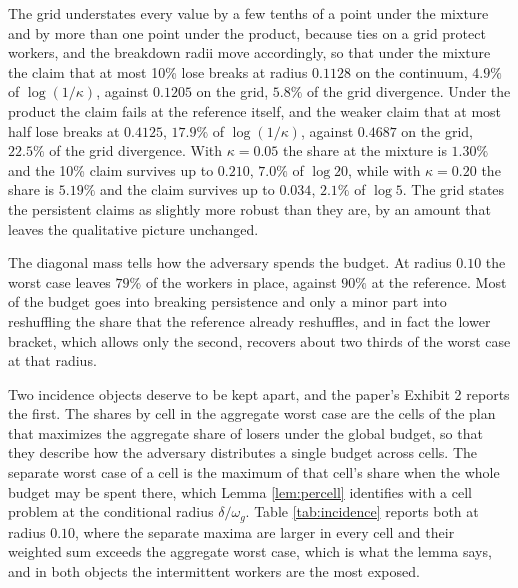 \documentclass[11pt,a4paper]{article}
\theoremstyle{notesplain}
\theoremstyle{notesupright}
\numberwithin{equation}{section}
\begin{document}
The grid understates every value by a few tenths of a point under the mixture and by more than one point under the product, because ties on a grid protect workers, and the breakdown radii move accordingly, so that under the mixture the claim that at most 10\% lose breaks at radius $0.1128$ on the continuum, $4.9\%$ of $\log(1/\kappa)$, against $0.1205$ on the grid, $5.8\%$ of the grid divergence. Under the product the claim fails at the reference itself, and the weaker claim that at most half lose breaks at $0.4125$, $17.9\%$ of $\log(1/\kappa)$, against $0.4687$ on the grid, $22.5\%$ of the grid divergence. With $\kappa=0.05$ the share at the mixture is $1.30\%$ and the 10\% claim survives up to $0.210$, $7.0\%$ of $\log20$, while with $\kappa=0.20$ the share is $5.19\%$ and the claim survives up to $0.034$, $2.1\%$ of $\log5$. The grid states the persistent claims as slightly more robust than they are, by an amount that leaves the qualitative picture unchanged.

The diagonal mass tells how the adversary spends the budget. At radius $0.10$ the worst case leaves $79\%$ of the workers in place, against $90\%$ at the reference. Most of the budget goes into breaking persistence and only a minor part into reshuffling the share that the reference already reshuffles, and in fact the lower bracket, which allows only the second, recovers about two thirds of the worst case at that radius.

Two incidence objects deserve to be kept apart, and the paper's Exhibit 2 reports the first. The shares by cell in the aggregate worst case are the cells of the plan that maximizes the aggregate share of losers under the global budget, so that they describe how the adversary distributes a single budget across cells. The separate worst case of a cell is the maximum of that cell's share when the whole budget may be spent there, which Lemma \ref{lem:percell} identifies with a cell problem at the conditional radius $\delta/\omega_g$. Table \ref{tab:incidence} reports both at radius $0.10$, where the separate maxima are larger in every cell and their weighted sum exceeds the aggregate worst case, which is what the lemma says, and in both objects the intermittent workers are the most exposed.
\end{document}
